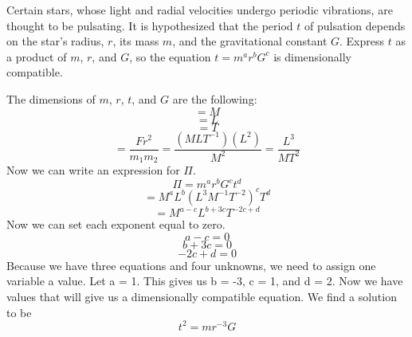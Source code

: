 \documentclass[11pt,answers]{exam}
\begin{document}
\begin{questions}
\item Certain stars, whose light and radial velocities undergo periodic vibrations, are thought to be pulsating.  It is hypothesized that the period $t$ of pulsation depends on the star's radius, $r$, its mass $m$, and the gravitational constant $G$.  Express $t$ as a product of $m$, $r$, and $G$, so the equation $t = m^a r^b G^c$ is dimensionally compatible.
\begin{solution}
The dimensions of $m$, $r$, $t$, and $G$ are the following:
\begin{equation*}
[m] = M
\end{equation*}
\begin{equation*}
[r] = L
\end{equation*}
\begin{equation*}
[t] = T
\end{equation*}
\begin{equation*}
[G] = \frac{Fr^2}{m_1m_2} = \frac{(MLT^{-1})(L^2)}{M^2} = \frac{L^3}{MT^2}
\end{equation*}
Now we can write an expression for $\Pi$.
\begin{equation*}
\Pi = m^ar^bG^ct^d
\end{equation*}
\begin{equation*}
[\Pi] = M^aL^b(L^3M^{-1}T^{-2})^cT^d
\end{equation*}
\begin{equation*}
[\Pi] = M^{a-c}L^{b+3c}T^{-2c + d}
\end{equation*}
Now we can set each exponent equal to zero.
\begin{equation*}
a-c = 0
\end{equation*}
\begin{equation*}
b+ 3c = 0
\end{equation*}
\begin{equation*}
-2c + d = 0
\end{equation*}
Because we have three equations and four unknowns, we need to assign one variable a value. Let a = 1. This gives us b = -3, c = 1, and d = 2. Now we have values that will give us a dimensionally compatible equation. We find a solution to be
\begin{equation*}
t^2 = mr^{-3}G
\end{equation*}

\end{solution}


\end{questions}
\end{document}
